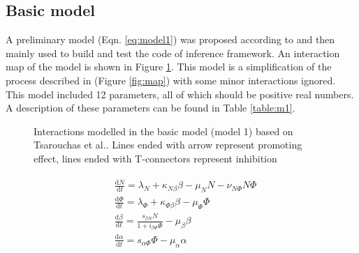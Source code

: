 \subsection{Basic model}

A preliminary model (Eqn. \ref{eq:model1}) was proposed according to \cite{ref:Tsarouchas} and then mainly used to build and test the code of inference framework. An interaction map of the model is shown in Figure \ref{fig:m1}. This model is a simplification of the process described in \cite{ref:Tsarouchas} (Figure \ref{fig:map}) with some minor interactions ignored. This model included 12 parameters, all of which should be positive real numbers. A description of these parameters can be found in Table \ref{table:m1}.

\begin{figure}
    \begin{center}
    \end{center}

    \caption[Interactions modelled in the basic model]%
    {Interactions modelled in the basic model (model 1) based on Tsarouchas et al.\cite{ref:Tsarouchas}. Lines ended with arrow represent promoting effect, lines ended with T-connectors represent inhibition}
    \label{fig:m1}

\end{figure}
\begin{align}
    \label{eq:model1}
    \begin{split}
        &\frac{\mathrm{d} N}{\mathrm{d} t}=\lambda_N+\kappa_{N\beta}\beta-\mu_NN-\nu_{N\Phi}N\Phi\\
        &\frac{\mathrm{d} \Phi}{\mathrm{d} t}=\lambda_\Phi+\kappa_{\Phi\beta}\beta-\mu_\Phi\Phi\\
        &\frac{\mathrm{d} \beta}{\mathrm{d} t}=\frac{s_{\beta N}N}{1+i_{\beta\Phi}\Phi}-\mu_\beta\beta\\
        &\frac{\mathrm{d} \alpha}{\mathrm{d} t}=s_{\alpha\Phi}\Phi-\mu_\alpha\alpha
    \end{split}
\end{align}
